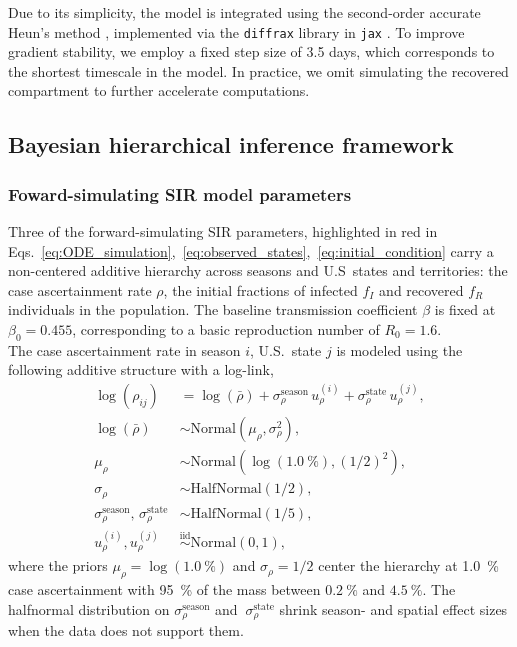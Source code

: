 \documentclass[11pt]{article}
\newcommand{\Normal}{\text{Normal}}
\newcommand{\HalfNormal}{\text{HalfNormal}}
\begin{document}
Due to its simplicity, the model is integrated using the second-order accurate Heun's method \citep{heun1900}, implemented via the \texttt{diffrax} library in \texttt{jax} \citep{kidger2021}. To improve gradient stability, we employ a fixed step size of 3.5 days, which corresponds to the shortest timescale in the model. In practice, we omit simulating the recovered compartment to further accelerate computations.

\subsection{Bayesian hierarchical inference framework}

\subsubsection*{Foward-simulating SIR model parameters}
Three of the forward-simulating SIR parameters, highlighted in red in Eqs.~\eqref{eq:ODE_simulation},~\eqref{eq:observed_states},~\eqref{eq:initial_condition} carry a non-centered additive hierarchy across seasons and U.S\ states and territories: the case ascertainment rate $\rho$, the initial fractions of infected $f_I$ and recovered $f_R$ individuals in the population. The baseline transmission coefficient $\beta$ is fixed at $\beta_0 = 0.455$, corresponding to a basic reproduction number of $R_0 = 1.6$.\\

The case ascertainment rate in season $i$, U.S.\ state $j$ is modeled using the following additive structure with a log-link,
\begin{align}
	 \log \left(\rho_{ij}\right) &= \log \left( \bar{\rho} \right) + \sigma^{\text{season}}_\rho\, u^{(i)}_{\rho} + \sigma^{\text{state}}_\rho\, u^{(j)}_{\rho}, \nonumber\\
    \log \left( \bar{\rho} \right)  &\sim \Normal\!\left(\mu_{\rho},\sigma^2_{\rho}\right), \nonumber\\
    \mu_{\rho} &\sim \Normal \left(\log(1.0~\%), (1/2)^2 \right), \nonumber \\
    \sigma_{\rho} &\sim \HalfNormal \left( 1/2 \right), \nonumber \\
    \sigma^{\text{season}}_\rho,\, \sigma^{\text{state}}_\rho &\sim \HalfNormal\! \left( 1/5 \right), \nonumber\\
    u^{(i)}_{\rho}, u^{(j)}_{\rho} & \overset{\mathrm{iid}}{\sim} \Normal(0,1),
\end{align}
where the priors $\mu_{\rho} = \log \left( 1.0~\% \right)$ and $\sigma_{\rho} = 1/2$ center the hierarchy at 1.0~\% case ascertainment with 95~\% of the mass between $0.2~\%$ and $4.5~\%$. The halfnormal distribution on $\sigma_{\rho}^{\text{season}}$ and $~\sigma_{\rho}^{\text{state}}$ shrink season- and spatial effect sizes when the data does not support them.\\
\end{document}

